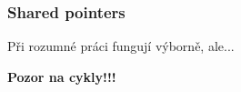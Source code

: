 \documentclass[usenames,dvipsnames,9pt]{beamer}
\begin{document}
\begin{frame}
  \frametitle{Shared pointers}

  Při rozumné práci fungují výborně, ale...

  \begin{center}
  	\LARGE \bf \faWarning \hspace{6pt} Pozor na cykly!!!
  \end{center}

  \vspace{1em}
  \begin{center}

\end{center}
\end{frame}
\end{document}
